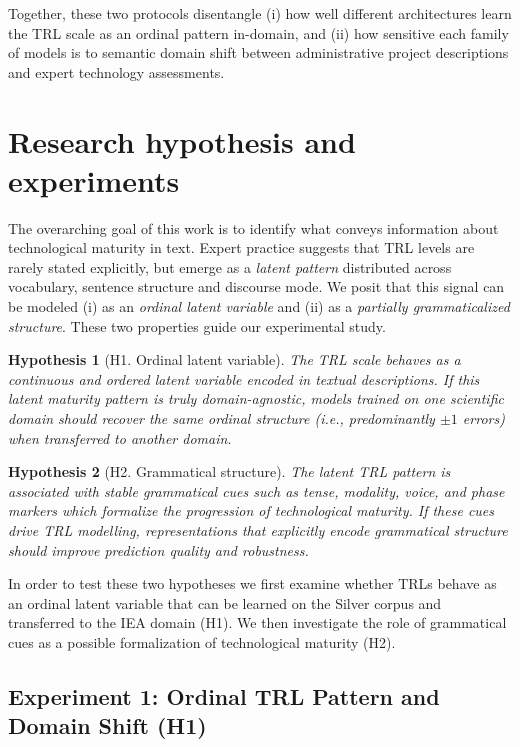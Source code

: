 \documentclass[runningheads]{llncs}
\begin{document}
Together, these two protocols disentangle (i) how well different architectures learn the TRL scale as an ordinal pattern in-domain, and (ii) how sensitive each family of models is to semantic domain shift between administrative project descriptions and expert technology assessments.

\section{Research hypothesis and experiments}
\label{sec:hyp}
\label{sec:experiments}

The overarching goal of this work is to identify what conveys information about technological maturity in text. Expert practice suggests that TRL levels are rarely stated explicitly, but emerge as a \emph{latent pattern} distributed across vocabulary, sentence structure and discourse mode. We posit that this signal can be modeled (i) as an \emph{ordinal latent variable} and (ii) as a \emph{partially grammaticalized structure}. These two properties guide our experimental study.

\newtheorem{hypothesis}{Hypothesis}
\begin{hypothesis}[H1. Ordinal latent variable]\label{H1}
The TRL scale behaves as a continuous and ordered latent variable encoded in textual descriptions.
If this latent maturity pattern is truly domain-agnostic, models trained on one scientific domain should recover the same ordinal structure (i.e., predominantly $\pm 1$ errors) when transferred to another domain.\end{hypothesis} 

\begin{hypothesis}[H2. Grammatical structure]\label{H2}
The latent TRL pattern is associated with stable grammatical cues such as tense, modality, voice, and phase markers which formalize the progression of technological maturity.
If these cues drive TRL modelling, representations that explicitly encode grammatical structure should improve prediction quality and robustness.
\end{hypothesis}

In order to test these two hypotheses we first examine whether TRLs behave as an
ordinal latent variable that can be learned on the Silver corpus and transferred
to the IEA domain (H1). We then investigate the role of grammatical cues as a
possible formalization of technological maturity (H2).

\subsection{Experiment 1: Ordinal TRL Pattern and Domain Shift (H1)}
\label{sec:exp1}
\end{document}
